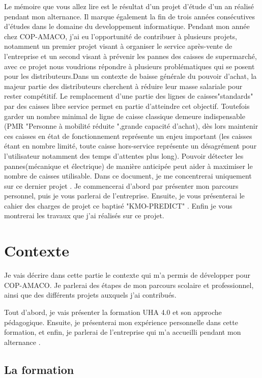 \documentclass[12pt]{article}
\begin{document}
\justify
\text
Le mémoire que vous allez lire est le résultat d'un projet d'étude d'un an réalisé pendant mon alternance. Il marque également la fin de trois années consécutives d'études dans le domaine du developpement informatique.
\justify
\text
Pendant mon année chez COP-AMACO, j'ai eu l'opportunité de contribuer à plusieurs projets, notamment un premier projet visant à organiser le service après-vente de l'entreprise et un second visant à prévenir les pannes  des caisses de supermarché, avec ce projet nous voudrions répondre à plusieurs problématiques qui se posent pour les distributeurs.Dans un contexte de baisse générale du pouvoir d'achat, la majeur partie des distributeurs cherchent à réduire leur masse salariale pour rester compétitif.
\justify
\text Le remplacement d'une partie des lignes de caisses"standards" par des caisses libre service permet en partie d'atteindre cet objectif. Toutefois garder un nombre minimal de ligne de caisse classique demeure indispensable (PMR "Personne à mobilité réduite ",grande capacité d'achat), dès lors maintenir ces caisses en état de fonctionnement représente un enjeu important (les caisses étant en nombre limité, toute caisse hors-service représente un désagrément pour l'utilisateur notamment des temps d'attentes plus long). Pouvoir détecter les pannes(mécanique et électrique) de manière anticipée peut aider à maximiser le nombre de caisses utilisable. Dans ce document, je me concentrerai uniquement sur ce dernier projet .
\justify
\text
Je commencerai d'abord par présenter mon parcours personnel, puis je vous parlerai de l'entreprise. Ensuite, je vous présenterai le cahier des charges de projet ce baptisé "KMO-PREDICT" . Enfin je vous montrerai les travaux que j'ai réalisés sur ce projet.


\newpage

\section{Contexte}
Je vais décrire dans cette partie le contexte qui m'a permis de développer pour COP-AMACO. Je parlerai des étapes de mon parcours scolaire et professionnel, ainsi que des différents projets auxquels j'ai contribués.

Tout d'abord, je vais présenter la formation UHA 4.0 et son approche pédagogique. Ensuite, je présenterai mon expérience personnelle dans cette formation, et enfin, je parlerai de l'entreprise qui m'a accueilli pendant mon alternance .

\subsection{La formation}
\end{document}
